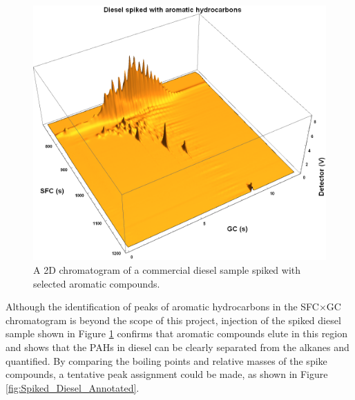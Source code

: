\begin{figure}
	\centering
	\includegraphics[width=\textwidth]{Figures/Spiked_Diesel.png}
	\decoRule	
	
\caption[Spiked diesel ]{A 2D chromatogram of a commercial diesel sample spiked
with selected aromatic compounds.}

	\label{fig:Spiked_Diesel} 
\end{figure}


Although the identification of peaks of aromatic hydrocarbons in the SFC×GC
chromatogram is beyond the scope of this project, injection of the spiked diesel
sample shown in Figure \ref{fig:Spiked_Diesel} confirms that aromatic compounds
elute in this region and shows that the PAHs in diesel can be clearly separated
from the alkanes and quantified. By comparing the boiling points and relative
masses of the spike compounds, a tentative peak assignment could be made, as
shown in Figure \ref{fig:Spiked_Diesel_Annotated}.

